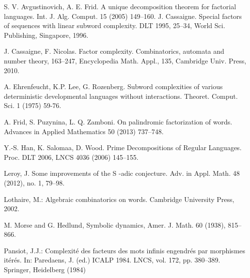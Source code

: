 \documentclass[runningheads,envcountsect,envcountsame]{llncs}
\begin{document}
\begin{thebibliography}{10}
S. V. Avgustinovich, A. E. Frid. A unique decomposition theorem for factorial languages. Int. J. Alg. Comput. 15 (2005) 149--160.
J. Cassaigne.
Special factors of sequences with linear subword complexity.
DLT 1995, 25--34, World Sci. Publishing, Singapore, 1996.

J. Cassaigne, F. Nicolas.
Factor complexity.
Combinatorics, automata and number theory, 163--247, Encyclopedia Math. Appl., 135, Cambridge Univ. Press, 2010.

 A. Ehrenfeucht, K.P. Lee, G. Rozenberg.
Subword complexities of various deterministic developmental languages without interactions.
Theoret. Comput. Sci. 1 (1975) 59-76.

 A. Frid, S. Puzynina, L. Q. Zamboni. On palindromic factorization of words. Advances in Applied Mathematics 50 (2013) 737--748.

Y.-S. Han, K. Salomaa, D. Wood. Prime Decompositions of Regular Languages. Proc. DLT 2006, LNCS 4036 (2006) 145--155.

  Leroy, J. Some improvements of the S -adic conjecture. Adv. in Appl. Math. 48 (2012), no. 1, 79--98.

Lothaire, M.: Algebraic combinatorics on words. Cambridge
University Press, 2002.

 M. Morse and G. Hedlund, Symbolic dynamics,
Amer. J. Math. 60 (1938),  815--866.

Pansiot, J.J.: Complexit\'{e} des facteurs des mots infinis engendr\'{e}s
par morphismes it\'{e}r\'{e}s. In: Paredaens, J. (ed.) ICALP 1984. LNCS,
vol. 172, pp. 380--389. Springer, Heidelberg (1984)
\end{thebibliography}
\end{document}
